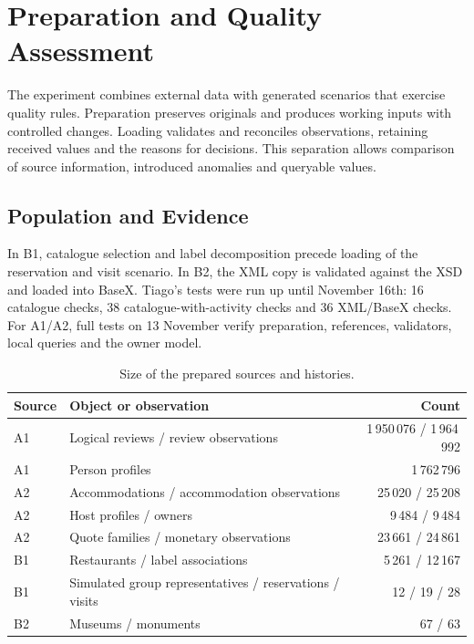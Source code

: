 \section{Preparation and Quality Assessment}\label{sec:povoamento_qualidade}
The experiment combines external data with generated scenarios that exercise quality rules. Preparation preserves originals and produces working inputs with controlled changes. Loading validates and reconciles observations, retaining received values and the reasons for decisions. This separation allows comparison of source information, introduced anomalies and queryable values.
\subsection{Population and Evidence}
In B1, catalogue selection and label decomposition precede loading of the reservation and visit scenario. In B2, the XML copy is validated against the XSD and loaded into BaseX. Tiago's tests were run up until November 16th: 16 catalogue checks, 38 catalogue-with-activity checks and 36 XML/BaseX checks. For A1/A2, full tests on 13 November verify preparation, references, validators, local queries and the owner model.
\begin{table}[!htbp]\centering\footnotesize\setlength{\tabcolsep}{4pt}\renewcommand{\arraystretch}{1.1}
\caption{Size of the prepared sources and histories.}\label{tab:contagens}
\begin{tabularx}{\textwidth}{lXr}\toprule\textbf{Source} & \textbf{Object or observation} & \textbf{Count} \\\midrule
A1 & Logical reviews / review observations & 1\,950\,076 / 1\,964\,992 \\
A1 & Person profiles & 1\,762\,796 \\
A2 & Accommodations / accommodation observations & 25\,020 / 25\,208 \\
A2 & Host profiles / owners & 9\,484 / 9\,484 \\
A2 & Quote families / monetary observations & 23\,661 / 24\,861 \\
B1 & Restaurants / label associations & 5\,261 / 12\,167 \\
B1 & Simulated group representatives / reservations / visits & 12 / 19 / 28 \\
B2 & Museums / monuments & 67 / 63 \\\bottomrule\end{tabularx}\end{table}
